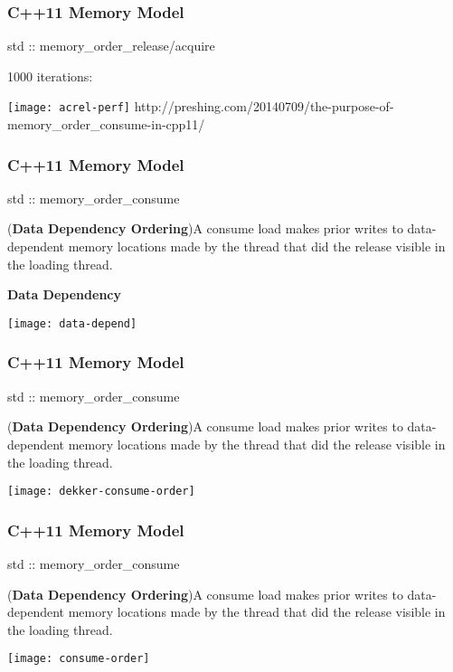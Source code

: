 \begin{frame}
    \frametitle{C++11 Memory Model}
    \LARGE
    std :: memory\_order\_release/acquire
    
    1000 iterations:
    
    \texttt{[image: acrel-perf]}
    \tiny
    http://preshing.com/20140709/the-purpose-of-memory\_order\_consume-in-cpp11/
    
\end{frame}

\begin{frame}
    \frametitle{C++11 Memory Model}
    \LARGE
    std :: memory\_order\_consume
    
    
    \normalsize
    (\textbf{Data Dependency Ordering})A consume load makes prior writes to data-dependent memory
    locations made by the thread that did the release visible in the
    loading thread.
    
    \LARGE
    \centering
    \textbf{Data Dependency}
    
    \texttt{[image: data-depend]}
    

\end{frame}


\begin{frame}
    \frametitle{C++11 Memory Model}
    \LARGE
    std :: memory\_order\_consume
    
    
    \normalsize
    (\textbf{Data Dependency Ordering})A consume load makes prior writes to data-dependent memory
    locations made by the thread that did the release visible in the
    loading thread.
    
    \texttt{[image: dekker-consume-order]}
\end{frame}


\begin{frame}
    \frametitle{C++11 Memory Model}
    \LARGE
    std :: memory\_order\_consume
    
    
    \normalsize
    (\textbf{Data Dependency Ordering})A consume load makes prior writes to data-dependent memory
    locations made by the thread that did the release visible in the
    loading thread.
    
    \texttt{[image: consume-order]}
\end{frame}

